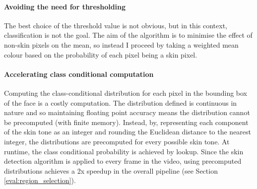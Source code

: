 \paragraph{Avoiding the need for thresholding}
The best choice of the threshold value is not obvious, but in this context, classification is not the goal.
The aim of the algorithm is to minimise the effect of non-skin pixels on the mean, so instead I proceed by taking a weighted 
mean colour based on the probability of each pixel being a skin pixel. 

\paragraph{Accelerating class conditional computation}
Computing the class-conditional distribution for each pixel in the bounding box of the face is a costly computation. 
The distribution defined is continuous in nature and so maintaining floating point accuracy means the distribution cannot be precomputed (with finite memory).
Instead, by, representing each component of the skin tone as an integer and rounding the Euclidean distance to the nearest integer, the distributions are precomputed 
for every possible skin tone. At runtime, the class conditional probability is achieved by lookup. Since the skin detection algorithm is applied to every frame in the video, 
using precomputed distributions achieves a 2x speedup in the overall pipeline (see Section \ref{eval:region_selection}).

